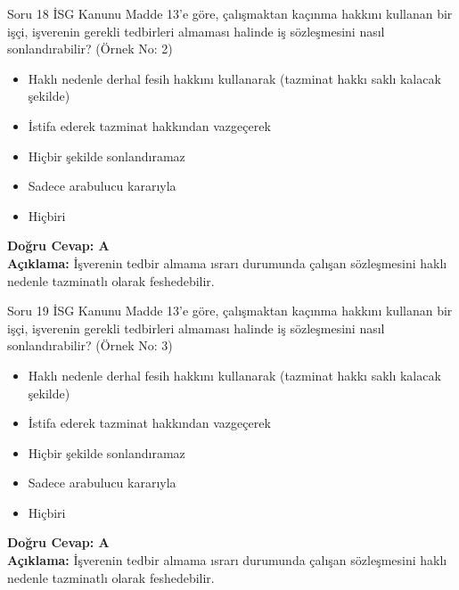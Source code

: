 \documentclass[12pt,a4paper]{article}
\begin{document}
\begin{testcard}{Soru 18}
    İSG Kanunu Madde 13'e göre, çalışmaktan kaçınma hakkını kullanan bir işçi, işverenin gerekli tedbirleri almaması halinde iş sözleşmesini nasıl sonlandırabilir? (Örnek No: 2)
    \begin{itemize}
        \item[A)] Haklı nedenle derhal fesih hakkını kullanarak (tazminat hakkı saklı kalacak şekilde)
        \item[B)] İstifa ederek tazminat hakkından vazgeçerek
        \item[C)] Hiçbir şekilde sonlandıramaz
        \item[D)] Sadece arabulucu kararıyla
        \item[E)] Hiçbiri
    \end{itemize}
    \tcblower
    \textbf{Doğru Cevap: A} \\
    \textbf{Açıklama:} İşverenin tedbir almama ısrarı durumunda çalışan sözleşmesini haklı nedenle tazminatlı olarak feshedebilir.
\end{testcard}

\begin{testcard}{Soru 19}
    İSG Kanunu Madde 13'e göre, çalışmaktan kaçınma hakkını kullanan bir işçi, işverenin gerekli tedbirleri almaması halinde iş sözleşmesini nasıl sonlandırabilir? (Örnek No: 3)
    \begin{itemize}
        \item[A)] Haklı nedenle derhal fesih hakkını kullanarak (tazminat hakkı saklı kalacak şekilde)
        \item[B)] İstifa ederek tazminat hakkından vazgeçerek
        \item[C)] Hiçbir şekilde sonlandıramaz
        \item[D)] Sadece arabulucu kararıyla
        \item[E)] Hiçbiri
    \end{itemize}
    \tcblower
    \textbf{Doğru Cevap: A} \\
    \textbf{Açıklama:} İşverenin tedbir almama ısrarı durumunda çalışan sözleşmesini haklı nedenle tazminatlı olarak feshedebilir.
\end{testcard}
\end{document}
